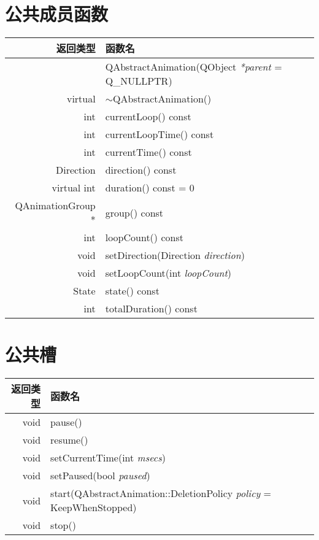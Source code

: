 \section{公共成员函数}

\begin{tabular}{|r|l|}

\hline
返回类型 &	函数名\\
\hline
& QAbstractAnimation(QObject \emph{*parent} = Q\_NULLPTR)\\
\hline
virtual&$\sim$QAbstractAnimation()\\
\hline
int	& currentLoop() const\\
\hline
int	& currentLoopTime() const\\
\hline
int	& currentTime() const\\
\hline
Direction& direction() const\\
\hline
virtual int	&duration() const = 0\\
\hline
QAnimationGroup *&	group() const\\
\hline
int	&loopCount() const\\
\hline
void&	setDirection(Direction \emph{direction})\\
\hline
void&	setLoopCount(int \emph{loopCount})\\
\hline
State&	state() const\\
\hline
int	& totalDuration() const\\
\hline
\end{tabular}

\section{公共槽}

\begin{tabular}{|r|l|}
\hline
返回类型&	函数名 \\
\hline
void&	pause()\\
\hline
void&	resume()\\
\hline
void&	setCurrentTime(int \emph{msecs})\\
\hline
void&	setPaused(bool \emph{paused})\\
\hline
void&	start(QAbstractAnimation::DeletionPolicy \emph{policy} = KeepWhenStopped)\\
\hline
void&	stop() \\
\hline
\end{tabular}